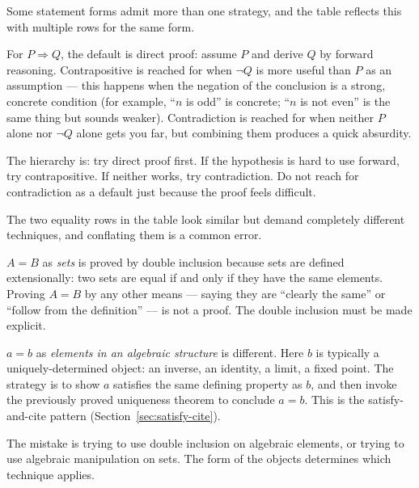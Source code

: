 \begin{remark}
Some statement forms admit more than one strategy, and the table
reflects this with multiple rows for the same form.

For $P \Rightarrow Q$, the default is direct proof: assume $P$ and
derive $Q$ by forward reasoning. Contrapositive is reached for when
$\neg Q$ is more useful than $P$ as an assumption --- this happens
when the negation of the conclusion is a strong, concrete condition
(for example, ``$n$ is odd'' is concrete; ``$n$ is not even'' is the
same thing but sounds weaker). Contradiction is reached for when neither
$P$ alone nor $\neg Q$ alone gets you far, but combining them produces
a quick absurdity.

The hierarchy is: try direct proof first. If the hypothesis is hard
to use forward, try contrapositive. If neither works, try contradiction.
Do not reach for contradiction as a default just because the proof
feels difficult.
\end{remark}

\begin{remark}
The two equality rows in the table look similar but demand completely
different techniques, and conflating them is a common error.

$A = B$ as \emph{sets} is proved by double inclusion because sets are
defined extensionally: two sets are equal if and only if they have the
same elements. Proving $A = B$ by any other means --- saying they are
``clearly the same'' or ``follow from the definition'' --- is not a proof.
The double inclusion must be made explicit.

$a = b$ as \emph{elements in an algebraic structure} is different.
Here $b$ is typically a uniquely-determined object: an inverse, an
identity, a limit, a fixed point. The strategy is to show $a$ satisfies
the same defining property as $b$, and then invoke the previously proved
uniqueness theorem to conclude $a = b$. This is the satisfy-and-cite pattern
(Section~\ref{sec:satisfy-cite}).

The mistake is trying to use double inclusion on algebraic elements, or
trying to use algebraic manipulation on sets. The form of the objects
determines which technique applies.
\end{remark}

